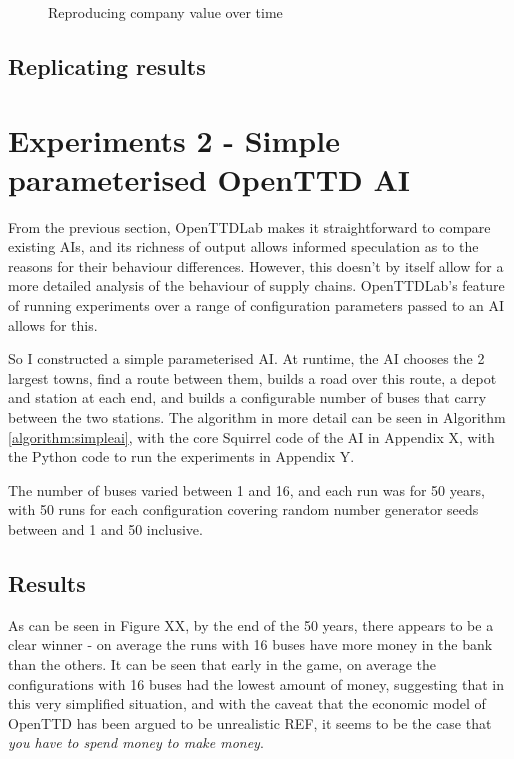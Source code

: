 \documentclass[logo,msc,dsti]{infthesis}    %
\begin{document}
{\begin{figure}[h]
\begin{gnuplot}[terminal=cairolatex,terminaloptions={size 5.3,3}]
\end{gnuplot}
\caption{Reproducing company value over time}
\label{figure:trains-ai-vs-admiral-ai-over-time}
\end{figure}

\section{Replicating results}


\chapter{Experiments 2 - Simple parameterised OpenTTD AI}
\label{chapter:experiments-simple-parameterised-ai}

From the previous section, OpenTTDLab makes it straightforward to compare existing AIs, and its richness of output allows informed speculation as to the reasons for their behaviour differences. However, this doesn't by itself allow for a more detailed analysis of the behaviour of supply chains. OpenTTDLab's feature of running experiments over a range of configuration parameters passed to an AI allows for this.

So I constructed a simple parameterised AI. At runtime, the AI chooses the 2 largest towns, find a route between them, builds a road over this route, a depot and station at each end, and builds a configurable number of buses that carry between the two stations. The algorithm in more detail can be seen in Algorithm \ref{algorithm:simpleai}, with the core Squirrel code of the AI in Appendix X, with the Python code to run the experiments in Appendix Y.

The number of buses varied between 1 and 16, and each run was for 50 years, with 50 runs for each configuration covering random number generator seeds between and 1 and 50 inclusive.

\section{Results}

As can be seen in Figure XX, by the end of the 50 years, there appears to be a clear winner - on average the runs with 16 buses have more money in the bank than the others. It can be seen that early in the game, on average the configurations with 16 buses had the lowest amount of money, suggesting that in this very simplified situation, and with the caveat that the economic model of OpenTTD has been argued to be unrealistic REF, it seems to be the case that \emph{you have to spend money to make money}.

}
\end{document}
